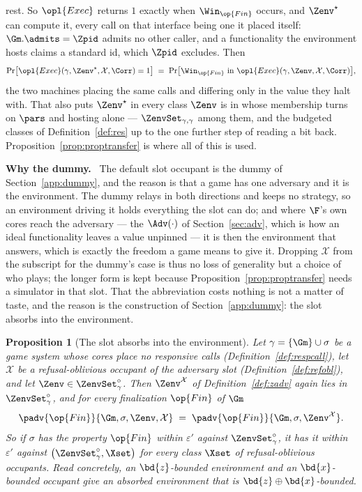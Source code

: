 \documentclass[10pt,oneside,openany]{book}
\newcommand{\heading}[1]{\medskip\par\noindent\textcolor{accent}{\textbf{#1.}}\ }
\theoremstyle{accentdef}
\theoremstyle{accentplain}
\newtheorem{proposition}[definition]{Proposition}
\begin{document}
rest. So $\opl{Exec}$ returns $1$ exactly when $\Win_{\op{Fin}}$ occurs, and $\Zenv^{\star}$ can compute
it, every
call on that interface being one it placed itself: $\Gm.\admits = \Zpid$ admits no other caller, and a
functionality the environment hosts claims a standard id, which $\Zpid$ excludes. Then
\[
  \Pr\bigl[\opl{Exec}(\gamma,\Zenv^{\star},\mathcal{X},\Corr) = 1\bigr]
  \;=\;
  \Pr\bigl[\Win_{\op{Fin}} \ \text{in} \ \opl{Exec}(\gamma,\Zenv,\mathcal{X},\Corr)\bigr] ,
\]
the two machines placing the same calls and differing only in the value they halt with. That also
puts $\Zenv^{\star}$ in every class $\Zenv$ is in whose membership turns on $\pars$ and hosting
alone --- $\ZenvSet_{\gamma,\gamma}$ among them, and the budgeted classes of
Definition~\ref{def:res} up to the one further step of reading a bit back.
Proposition~\ref{prop:proptransfer} is where all of this is used.

\heading{Why the dummy} The default slot occupant is the dummy of Section~\ref{app:dummy}, and the
reason is that a game has one adversary and it is the environment. The dummy relays in both
directions and keeps no strategy, so an environment driving it holds everything the slot can do; and
where $\F$'s own cores reach the adversary --- the $\Adv(\cdot)$ of Section~\ref{sec:adv}, which is how
an ideal functionality leaves a value unpinned --- it is then the environment that answers, which is
exactly the freedom a game means to give it. Dropping $\mathcal{X}$ from the subscript for the dummy's
case is thus no loss of generality but a choice of who plays; the longer form is kept because
Proposition~\ref{prop:proptransfer} needs a simulator in that slot. That the abbreviation costs nothing
is not a matter of taste, and the reason is the construction of Section~\ref{app:dummy}: the slot
absorbs into the environment.

\begin{proposition}[The slot absorbs into the environment]\label{prop:propslotabs}
Let $\gamma = \{\Gm\} \cup \sigma$ be a game system whose cores place no responsive calls
(Definition~\ref{def:respcall}), let $\mathcal{X}$ be a refusal-oblivious occupant of the adversary
slot (Definition~\ref{def:refobl}), and let $\Zenv \in \ZenvSet^{\circ}_{\gamma}$. Then
$\Zenv^{\mathcal{X}}$ of Definition~\ref{def:zadv} again lies in $\ZenvSet^{\circ}_{\gamma}$, and for
every finalization $\op{Fin}$ of $\Gm$
\[
  \padv{\op{Fin}}{\Gm,\sigma,\Zenv,\mathcal{X}}
  \;=\;
  \padv{\op{Fin}}{\Gm,\sigma,\Zenv^{\mathcal{X}}} .
\]
So if $\sigma$ has the property $\op{Fin}$ within $\varepsilon'$ against $\ZenvSet^{\circ}_{\gamma}$,
it has
it within $\varepsilon'$ against $\bigl(\ZenvSet^{\circ}_{\gamma},\Xset\bigr)$ for every class $\Xset$
of refusal-oblivious occupants. Read concretely, an $\bd{z}$-bounded environment and an
$\bd{x}$-bounded occupant give an absorbed environment that is $\bd{z} \oplus \bd{x}$-bounded.
\end{proposition}
\end{document}
